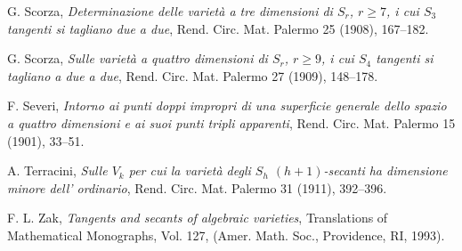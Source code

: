 \documentclass[11pt]{amsart}
\theoremstyle{theorem} %
\theoremstyle{definition}
\numberwithin{equation}{section}
\begin{document}
\begin{thebibliography}{PTW02}
 G. Scorza, \emph{Determinazione delle variet\`a a tre dimensioni di $S_r$, $r\ge7$, i cui $S_3$ tangenti si tagliano due a due}, Rend. Circ. Mat. Palermo 25 (1908), 167--182.

 G. Scorza, \emph{Sulle variet\`a a quattro dimensioni di $S_r$, $r\ge9$, i cui $S_4$ tangenti si tagliano a due a due}, Rend. Circ. Mat. Palermo 27 (1909), 148--178.

 F. Severi, \emph{Intorno ai punti doppi impropri di una superficie generale dello spazio a quattro dimensioni e ai suoi punti tripli apparenti}, Rend. Circ. Mat. Palermo 15 (1901), 33--51.

 A. Terracini, \emph{Sulle $V_k$ per cui la variet\`a degli $S_h$ $(h+1)$-secanti ha dimensione minore dell' ordinario}, Rend. Circ. Mat. Palermo 31 (1911), 392--396.

 F. L. Zak, \emph{Tangents and secants of algebraic varieties}, Translations of Mathematical Monographs, Vol. 127, (Amer. Math. Soc., Providence, RI, 1993).

\end{thebibliography}
\end{document}
